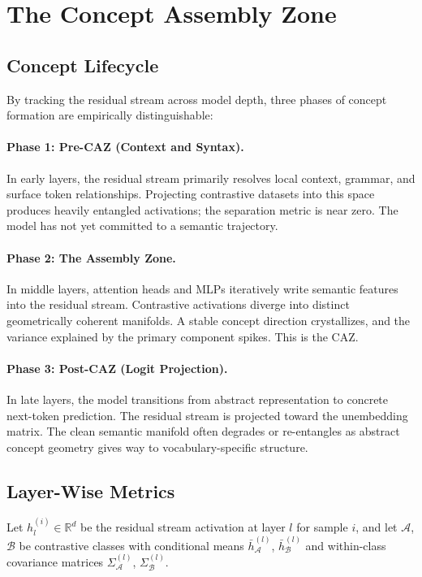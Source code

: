 \documentclass[11pt,a4paper]{article}
\begin{document}
\section{The Concept Assembly Zone}
\label{sec:caz}

\subsection{Concept Lifecycle}

By tracking the residual stream across model depth, three phases of concept formation
are empirically distinguishable:

\paragraph{Phase 1: Pre-CAZ (Context and Syntax).}
In early layers, the residual stream primarily resolves local context, grammar, and
surface token relationships. Projecting contrastive datasets into this space produces
heavily entangled activations; the separation metric is near zero. The model has not
yet committed to a semantic trajectory.

\paragraph{Phase 2: The Assembly Zone.}
In middle layers, attention heads and MLPs iteratively write semantic features into
the residual stream. Contrastive activations diverge into distinct geometrically
coherent manifolds. A stable concept direction crystallizes, and the variance
explained by the primary component spikes. This is the CAZ.

\paragraph{Phase 3: Post-CAZ (Logit Projection).}
In late layers, the model transitions from abstract representation to concrete
next-token prediction. The residual stream is projected toward the unembedding matrix.
The clean semantic manifold often degrades or re-entangles as abstract concept
geometry gives way to vocabulary-specific structure.

\subsection{Layer-Wise Metrics}

Let $h_l^{(i)} \in \mathbb{R}^d$ be the residual stream activation at layer $l$ for
sample $i$, and let $\mathcal{A}$, $\mathcal{B}$ be contrastive classes with
conditional means $\bar{h}_\mathcal{A}^{(l)}$, $\bar{h}_\mathcal{B}^{(l)}$ and
within-class covariance matrices $\Sigma_\mathcal{A}^{(l)}$, $\Sigma_\mathcal{B}^{(l)}$.
\end{document}
